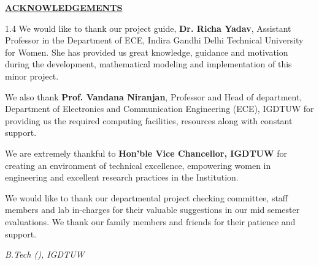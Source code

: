 \thispagestyle{empty}
\vspace*{-0.8cm}
\begin{center}
	{\Large\textbf{\underline{ACKNOWLEDGEMENTS}}}\par
\end{center}

\vspace{0.3cm}
\begin{spacing}{1.4}
\noindent We would like to thank our project guide, \textbf{Dr. Richa Yadav}, Assistant Professor in the Department of ECE, Indira Gandhi Delhi Technical University for Women. She has provided us great knowledge, guidance and motivation during the development, mathematical modeling and implementation of this minor project.\par

\noindent We also thank \textbf{Prof. Vandana Niranjan}, Professor and Head of department, Department of Electronics and Communication Engineering (ECE), IGDTUW for providing us the required computing facilities, resources along with constant support.\par

\noindent We are extremely thankful to \textbf{Hon'ble Vice Chancellor, IGDTUW} for creating an environment of technical excellence, empowering women in engineering and excellent research practices in the Institution.\par

\noindent We would like to thank our departmental project checking committee, staff members and lab in-charges for their valuable suggestions in our mid semester evaluations. We thank our family members and friends for their patience and support.\par
\end{spacing}

\vfill
\begin{flushright}
	\textbf{\printStuNameA}\par
	\textbf{\printStuNameB}\par
	\textbf{\printStuNameC}\par
	\textit{B.Tech (\printDepartmentSF), IGDTUW}
\end{flushright}
\vspace*{0.2cm}
\thispagestyle{empty}
